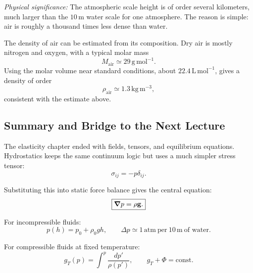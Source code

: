\documentclass[../main.tex]{subfiles}
\begin{document}
\textit{Physical significance:} The atmospheric scale height is of order several kilometers, much larger than the $10\,\mathrm{m}$ water scale for one atmosphere. The reason is simple: air is roughly a thousand times less dense than water.

The density of air can be estimated from its composition. Dry air is mostly nitrogen and oxygen, with a typical molar mass
\begin{equation}
  M_{\mathrm{air}}\simeq 29\,\mathrm{g\,mol^{-1}}.
  \label{eq:lec10_air_molar_mass}
\end{equation}
Using the molar volume near standard conditions, about $22.4\,\mathrm{L\,mol^{-1}}$, gives a density of order
\begin{equation}
  \rho_{\mathrm{air}}\simeq 1.3\,\mathrm{kg\,m^{-3}},
  \label{eq:lec10_air_density_estimate}
\end{equation}
consistent with the estimate above.

\subsection{Summary and Bridge to the Next Lecture}\label{sec:lec10:summary}

The elasticity chapter ended with fields, tensors, and equilibrium equations. Hydrostatics keeps the same continuum logic but uses a much simpler stress tensor:
\begin{equation}
  \boxed{\sigma_{ij}=-p\delta_{ij}.}
  \label{eq:lec10_summary_stress}
\end{equation}

Substituting this into static force balance gives the central equation:
\begin{equation}
  \boxed{\grad p=\rho\mathbf{g}.}
  \label{eq:lec10_summary_hydrostatic}
\end{equation}

For incompressible fluids:
\begin{equation}
  \boxed{p(h)=p_0+\rho_0gh,}
  \qquad
  \Delta p\simeq 1\,\mathrm{atm}\ \text{per}\ 10\,\mathrm{m}\ \text{of water}.
  \label{eq:lec10_summary_incompressible}
\end{equation}

For compressible fluids at fixed temperature:
\begin{equation}
  \boxed{g_T(p)=\int^p\frac{dp'}{\rho(p')},\qquad g_T+\Phi=\mathrm{const}.}
  \label{eq:lec10_summary_compressible}
\end{equation}
\end{document}
